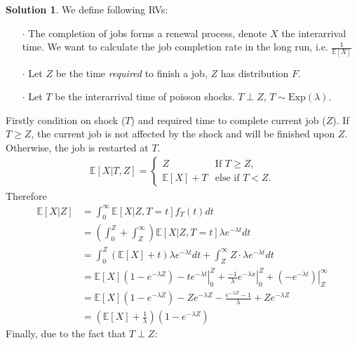 \documentclass[a4paper, 10pt]{article}
\theoremstyle{definition}
\theoremstyle{hSol}
\newtheorem*{solution}{Solution}
\begin{document}
\begin{solution} We define following RVs:
\begin{itemize}
  \item[$\cdot$] The completion of jobs forms a renewal process, denote $X$ the interarrival time. We want to calculate the job completion rate in the long run, i.e. $\frac{1}{\mathbb{E}\left[X\right]}$
  \item[$\cdot$] Let $Z$ be the time \emph{required} to finish a job, $Z$ has distribution $F$.
  \item[$\cdot$] Let $T$ be the interarrival time of poisson shocks. $T \perp Z$, $T\sim \text{Exp}(\lambda)$.
\end{itemize}
Firstly condition on shock ($T$) and required time to complete current job ($Z$). If $T\geq Z$, the current job is not affected by the shock and will be finished upon $Z$. Otherwise, the job is restarted at $T$.
\begin{equation}
  \begin{split}
    \mathbb{E}\left[X|T,Z\right] = 
    \begin{cases}
      Z & \text{If $T\geq Z$,} \\
      \mathbb{E}\left[X\right] + T & \text{else if $T<Z$.}
    \end{cases}
  \end{split}
\end{equation}
Therefore
\begin{equation}
  \begin{split}
    \mathbb{E}\left[X|Z\right] &= \int_{0}^{\infty} \mathbb{E}\left[X|Z,T=t\right] f_T(t) dt\\
    &= \left(\int_{0}^{Z} + \int_{Z}^{\infty}\right) \mathbb{E}\left[X|Z,T=t\right] \lambda e^{-\lambda t} dt\\
    &= \int_0^Z (\mathbb{E}\left[X\right] + t)\lambda e^{-\lambda t} dt + \int_Z^{\infty} Z \cdot \lambda e^{-\lambda t} dt\\
    &= \mathbb{E}\left[X\right](1-e^{-\lambda Z}) - \left.te^{-\lambda t}\right|_0^Z +\left. \frac{-1}{\lambda} e^{-\lambda x}\right|_0^Z + \left.(-e^{-\lambda t})\right|_Z^{\infty} \\
    &= \mathbb{E}\left[X\right](1-e^{-\lambda Z}) - Ze^{-\lambda Z} - \frac{e^{-\lambda Z}-1}{\lambda} + Ze^{-\lambda Z}\\
    &= \left(\mathbb{E}\left[X\right]+\frac{1}{\lambda}\right)(1-e^{-\lambda Z})
  \end{split}
\end{equation}
Finally, due to the fact that $T\perp Z$:

\end{solution}
\end{document}
